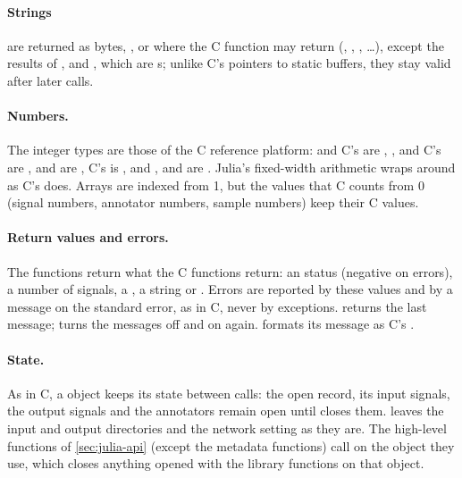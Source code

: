 \paragraph{Strings} are returned as bytes, , or  where
the C function may return  (, , ,
\ldots), except the results of ,  and , which are
s; unlike C's pointers to static buffers, they stay valid after later calls.

\paragraph{Numbers.} The integer types are those of the C reference platform:
 and C's  are , ,
 and C's  are ,  and
 are , C's  is , and
,  and  are .
Julia's fixed-width arithmetic wraps around as C's does. Arrays are indexed from 1, but
the values that C counts from 0 (signal numbers, annotator numbers, sample numbers) keep
their C values.

\paragraph{Return values and errors.} The functions return what the C functions return:
an  status (negative on errors), a number of signals, a , a
string or . Errors are reported by these values and by a message on the
standard error, as in C, never by exceptions.  returns the last message;
 turns the messages off and  on again.
 formats its message as C's .

\paragraph{State.} As in C, a  object keeps its state between calls: the open
record, its input signals, the output signals and the annotators remain open until
 closes them.  leaves the input and output directories
and the network setting as they are. The high-level functions of \cref{sec:julia-api}
(except the metadata functions) call  on the  object they use,
which closes anything opened with the library functions on that object.

